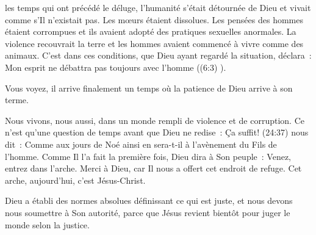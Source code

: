 


 les temps qui ont précédé le déluge, l'humanité s'était
 détournée de Dieu et vivait comme s'Il n'existait pas. Les mœurs étaient
 dissolues. Les pensées des hommes étaient corrompues et ils avaient adopté
 des pratiques sexuelles anormales. La violence recouvrait la terre et les
 hommes avaient commencé à vivre comme des animaux. C'est dans ces conditions,
 que Dieu ayant regardé la situation, déclara~: \og Mon esprit ne débattra pas
 toujours avec l'homme \fg{} ((6:3) \KJF{}). 

Vous voyez, il arrive finalement un temps où la patience de Dieu arrive à son terme. 

Nous vivons, nous aussi, dans un monde rempli de violence et de corruption.
 Ce n'est qu'une question de temps avant que Dieu ne redise~: \og Ça suffit! \fg{} 
 (24:37) nous dit~: \og Comme aux jours de Noé ainsi en sera-t-il
 à l'avènement du Fils de l'homme.\fg{} Comme Il l'a fait la première fois, Dieu
 dira à Son peuple~: \og Venez, entrez dans l'arche. \fg{} Merci à Dieu, car Il
 nous a offert cet endroit de refuge. Cet arche, aujourd'hui, c'est Jésus-Christ.



Dieu a établi des normes absolues définissant ce qui est juste, et nous devons
 nous soumettre à Son autorité, parce que Jésus revient bientôt pour juger le
 monde selon la justice.

\dvrule





